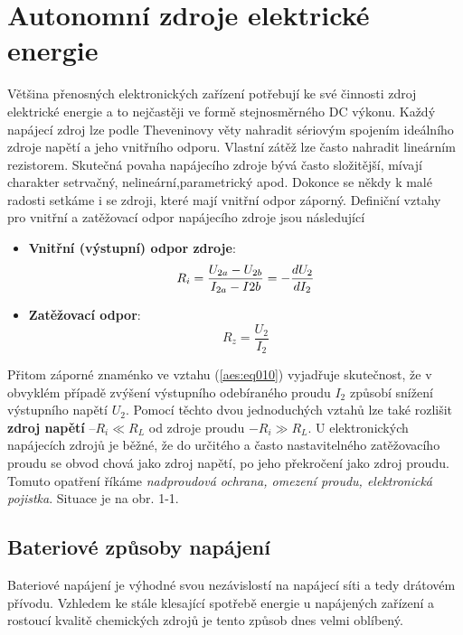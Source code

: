 \chapter{Autonomní zdroje elektrické energie}
\minitoc
  Většina přenosných elektronických zařízení potřebují ke své činnosti zdroj elektrické energie a 
  to nejčastěji ve formě stejnosměrného DC výkonu. Každý napájecí zdroj lze podle Theveninovy věty 
  nahradit sériovým spojením ideálního zdroje napětí a jeho vnitřního odporu. Vlastní zátěž lze 
  často nahradit lineárním rezistorem. Skutečná povaha napájecího zdroje bývá často složitější, 
  mívají charakter setrvačný, nelineární,pa\-ra\-me\-tri\-cký apod. Dokonce se někdy k malé radosti 
  setkáme 
  i se zdroji, které mají vnitřní odpor záporný. Definiční vztahy pro vnitřní a zatěžovací odpor 
  napájecího zdroje jsou následující
  \begin{itemize}
    \item \textbf{Vnitřní (výstupní) odpor zdroje}:
          \begin{equation}\label{aes:eq010}
            R_i = \frac{U_{2a}-U_{2b}}{I_{2a} - I{2b}} = -\frac{d U_2}{d I_2}
          \end{equation}
    \item \textbf{Zatěžovací odpor}:
          \begin{equation}\label{aes:eq011}
            R_z = \frac{U_2}{I_2}
          \end{equation}
  \end{itemize}
  Přitom záporné znaménko ve vztahu (\ref{aes:eq010}) vyjadřuje skutečnost, že v obvyklém případě 
  zvýšení výstupního odebíraného proudu \(I_2\) způsobí snížení výstupního napětí \(U_2\). Pomocí 
  těchto dvou jednoduchých vztahů lze také rozlišit \textbf{zdroj napětí} \(– R_i \ll R_L\) od 
  zdroje proudu \(- R_i\gg R_L\). U elektronických napájecích zdrojů je běžné, že do určitého a 
  často nastavitelného zatěžovacího proudu se obvod chová jako zdroj napětí, po jeho překročení 
  jako zdroj proudu. Tomuto opatření říkáme \emph{nadproudová ochrana, omezení proudu, elektronická 
  pojistka}. Situace je na obr. 1-1.
  
  \section{Bateriové způsoby napájení}
    Bateriové napájení je výhodné svou nezávislostí na napájecí síti a tedy drátovém přívodu. 
    Vzhledem ke stále klesající spotřebě energie u napájených zařízení a rostoucí kvalitě 
    chemických zdrojů je tento způsob dnes velmi oblíbený.
   

